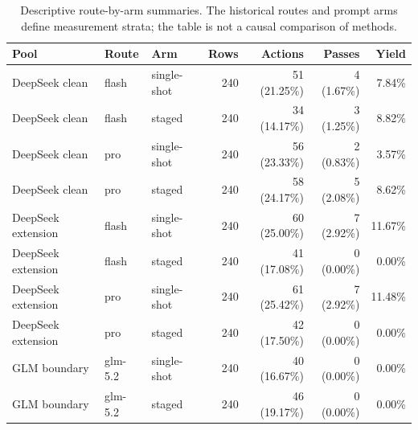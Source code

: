 
\begin{table}[H]
\centering
\caption{Descriptive route-by-arm summaries. The historical routes and prompt arms define measurement strata; the table is not a causal comparison of methods.}
\label{tab:stratified}
\small
\setlength{\tabcolsep}{4pt}
\begin{tabular}{@{}lllrrrr@{}}
\toprule
Pool & Route & Arm & Rows & Actions & Passes & Yield \\
\midrule
DeepSeek clean & flash & single-shot & 240 & 51 (21.25\%) & 4 (1.67\%) & 7.84\% \\
DeepSeek clean & flash & staged & 240 & 34 (14.17\%) & 3 (1.25\%) & 8.82\% \\
DeepSeek clean & pro & single-shot & 240 & 56 (23.33\%) & 2 (0.83\%) & 3.57\% \\
DeepSeek clean & pro & staged & 240 & 58 (24.17\%) & 5 (2.08\%) & 8.62\% \\
DeepSeek extension & flash & single-shot & 240 & 60 (25.00\%) & 7 (2.92\%) & 11.67\% \\
DeepSeek extension & flash & staged & 240 & 41 (17.08\%) & 0 (0.00\%) & 0.00\% \\
DeepSeek extension & pro & single-shot & 240 & 61 (25.42\%) & 7 (2.92\%) & 11.48\% \\
DeepSeek extension & pro & staged & 240 & 42 (17.50\%) & 0 (0.00\%) & 0.00\% \\
GLM boundary & glm-5.2 & single-shot & 240 & 40 (16.67\%) & 0 (0.00\%) & 0.00\% \\
GLM boundary & glm-5.2 & staged & 240 & 46 (19.17\%) & 0 (0.00\%) & 0.00\% \\
\bottomrule
\end{tabular}
\end{table}
